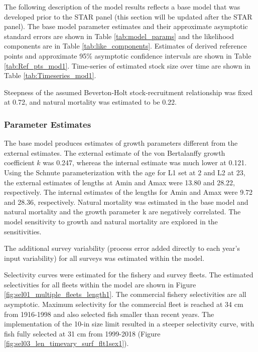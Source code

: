 \documentclass[12pt,]{article}
\begin{document}
The following description of the model results reflects a base model
that was developed prior to the STAR panel (this section will be updated
after the STAR panel). The base model parameter estimates and their
approximate asymptotic standard errors are shown in Table
\ref{tab:model_params} and the likelihood components are in Table
\ref{tab:like_components}. Estimates of derived reference points and
approximate 95\% asymptotic confidence intervals are shown in Table
\ref{tab:Ref_pts_mod1}. Time-series of estimated stock size over time
are shown in Table \ref{tab:Timeseries_mod1}.

Steepness of the assumed Beverton-Holt stock-recruitment relationship
was fixed at 0.72, and natural mortality was estimated to be 0.22.

\subsubsection{Parameter Estimates}\label{parameter-estimates}

The base model produces estimates of growth parameters different from
the external estimates. The external estimate of the von Bertalanffy
growth coefficient \(k\) was 0.247, whereas the internal estimate was
much lower at 0.121. Using the Schnute parameterization with the age for
L1 set at 2 and L2 at 23, the external estimates of lengths at Amin and
Amax were 13.80 and 28.22, respectively. The internal estimates of the
lengths for Amin and Amax were 9.72 and 28.36, respectively. Natural
mortality was estimated in the base model and natural mortality and the
growth parameter k are negatively correlated. The model sensitivity to
growth and natural mortality are explored in the sensitivities.

The additional survey variability (process error added directly to each
year's input variability) for all surveys was estimated within the
model.

Selectivity curves were estimated for the fishery and survey fleets. The
estimated selectivities for all fleets within the model are shown in
Figure \ref{fig:sel01_multiple_fleets_length1}. The commercial fishery
selectivities are all asymptotic. Maximum selectivity for the commercial
fleet is reached at 34 cm from 1916-1998 and also selected fish smaller
than recent years. The implementation of the 10-in size limit resulted
in a steeper selectivity curve, with fish fully selected at 31 cm from
1999-2018 (Figure \ref{fig:sel03_len_timevary_surf_flt1sex1}).
\end{document}

